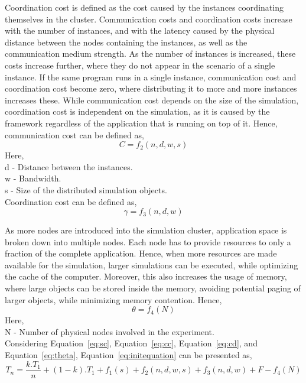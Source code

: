 Coordination cost is defined as the cost caused by the instances coordinating themselves in the cluster. Communication costs and coordination costs increase with the number of instances, and with the latency caused by the physical distance between the nodes containing the instances, as well as the communication medium strength. As the number of instances is increased, these costs increase further, where they do not appear in the scenario of a single instance. If the same program runs in a single instance, communication cost and coordination cost become zero, where distributing it to more and more instances increases these. While communication cost depends on the size of the simulation, coordination cost is independent on the simulation, as it is caused by the framework regardless of the application that is running on top of it. Hence, communication cost can be defined as,
\begin{equation} \label{eq:cc}
C = f_{2}(n, d, w, s)
\end{equation}
Here,\\
d - Distance between the instances.\\
w - Bandwidth.\\
s - Size of the distributed simulation objects.\\

Coordination cost can be defined as,
\begin{equation} \label{eq:cd}
\gamma = f_{3}(n, d, w)
\end{equation}

As more nodes are introduced into the simulation cluster, application space is broken down into multiple nodes. Each node has to provide resources to only a fraction of the complete application. Hence, when more resources are made available for the simulation, larger simulations can be executed, while optimizing the cache of the computer. Moreover, this also increases the usage of memory, where large objects can be stored inside the memory, avoiding potential paging of larger objects, while minimizing memory contention. Hence, 
\begin{equation} \label{eq:theta}
\theta = f_{4}(N) 
\end{equation}
Here,\\
N - Number of physical nodes involved in the experiment.\\


Considering Equation~\ref{eq:sc}, Equation~\ref{eq:cc}, Equation~\ref{eq:cd}, and Equation~\ref{eq:theta}, Equation~\ref{eq:initequation} can be presented as,
\begin{equation} \label{eq:iequation}
T_{n} = \frac{k.T_{1}}{n} + (1-k).T_{1} + f_{1}(s) + f_{2}(n, d, w, s) + f_{3}(n, d, w) + F - f_{4}(N)
\end{equation}
 
